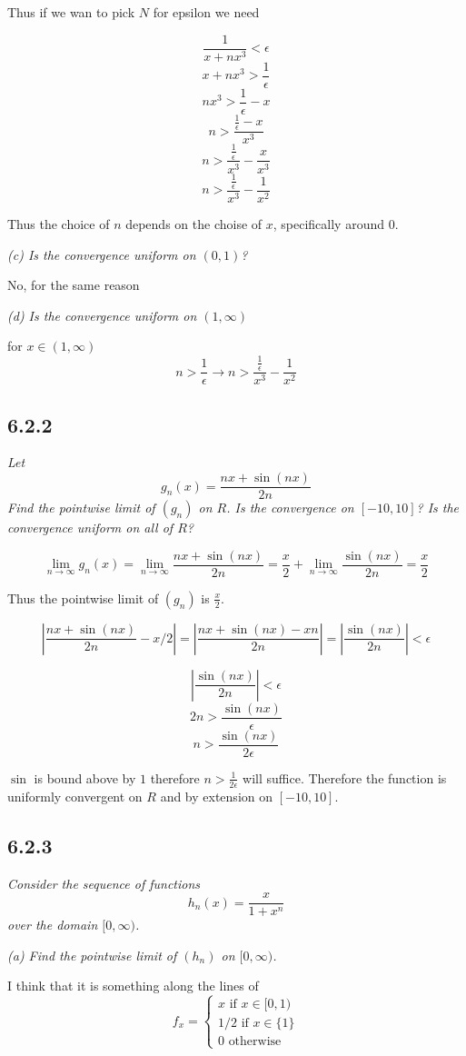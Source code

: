 \documentclass[11pt,oneside,titlepage]{book}
\begin{document}
Thus if we wan to pick $N$ for epsilon we need

$$\frac{1}{x + nx^3} < \epsilon$$
$$x + nx^3 > \frac{1}{\epsilon}$$
$$nx^3 > \frac{1}{\epsilon} - x$$
$$n > \frac{\frac{1}{\epsilon} - x}{x^3}$$
$$n > \frac{\frac{1}{\epsilon}}{x^3} - \frac{x}{x^3}$$
$$n > \frac{\frac{1}{\epsilon}}{x^3} - \frac{1}{x^2}$$

Thus the choice of $n$ depends on the choise of $x$, specifically around
0.

\textit{(c) Is the convergence uniform on $(0, 1)$?}

No, for the same reason

\textit{(d) Is the convergence uniform on $(1, \infty)$}

for $x \in (1, \infty)$
$$n > \frac{1}{\epsilon} \to n > \frac{\frac{1}{\epsilon}}{x^3} - \frac{1}{x^2}$$


\subsection*{6.2.2}
\textit{Let}
$$g_n(x) = \frac{nx + \sin{(nx)}}{2n}$$
\textit{Find the pointwise limit of $(g_n)$ on $R$. Is the convergence on
  $[-10, 10]$? Is the convergence uniform on all of $R$?}

$$\lim_{n \to \infty}{g_n(x)} = \lim_{n \to \infty}\frac{nx + \sin{(nx)}}{2n}
= \frac{x}{2} + \lim_{n \to \infty}\frac{\sin{(nx)}}{2n} = \frac{x}{2}$$

Thus the pointwise limit of $(g_n)$ is $\frac{x}{2}$.

$$|\frac{nx + \sin{(nx)}}{2n} - x/2| =
|\frac{nx + \sin{(nx)} - xn}{2n} | =
|\frac{\sin{(nx)}}{2n} | < \epsilon$$

$$|\frac{\sin{(nx)}}{2n} | < \epsilon$$
$$2n  > \frac{\sin{(nx)}}{\epsilon}$$
$$n  > \frac{\sin{(nx)}}{2\epsilon}$$

$\sin$ is bound above by $1$ therefore $n > \frac{1}{2\epsilon}$ will suffice.
Therefore the function is uniformly convergent on $R$ and by
extension on $[-10, 10]$.

\subsection*{6.2.3}
\textit{Consider the sequence of functions}
$$h_n(x) = \frac{x}{1 + x^n}$$
\textit{over the domain $[0, \infty)$.}

\textit{(a) Find the pointwise limit of $(h_n)$ on $[0, \infty)$.}

I think that it is something along the lines of
$$
f_x =
\begin{cases}
  x \text{ if } x \in [0, 1) \\
  1/2 \text{ if } x \in \{1\} \\
  0 \text{ otherwise }
\end{cases}
$$
\end{document}

